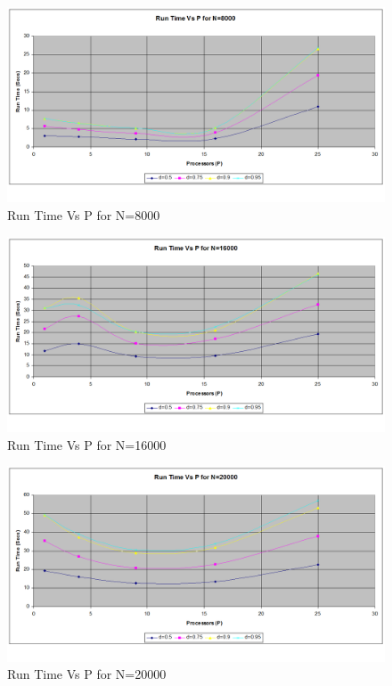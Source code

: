 \documentclass[twoside,11pt]{article}\usepackage{amsmath,amsfonts,amsthm,fullpage}
\begin{document}
\begin{figure}[!htbp]
\centering
\includegraphics[scale=.46]{charts/runtime_p_d_n_8000} 
\caption{Run Time Vs P for N=8000}
\label{Run Time Vs P for N=8000}
\end{figure}

\begin{figure}[!htbp]
\centering
\includegraphics[scale=.46]{charts/runtime_p_d_n_16000} 
\caption{Run Time Vs P for N=16000}
\label{Run Time Vs P for N=16000}
\end{figure}

\begin{figure}[!htbp]
\centering
\includegraphics[scale=.46]{charts/runtime_p_d_n_20000} 
\caption{Run Time Vs P for N=20000}
\label{Run Time Vs P for N=20000}
\end{figure}
\end{document}

